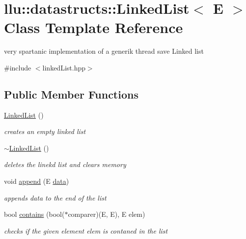 \hypertarget{classllu_1_1datastructs_1_1_linked_list}{\section{llu\+:\+:datastructs\+:\+:Linked\+List$<$ E $>$ Class Template Reference}
\label{classllu_1_1datastructs_1_1_linked_list}
}


very spartanic implementation of a generik thread save Linked list  




{\ttfamily \#include $<$linked\+List.\+hpp$>$}

\subsection*{Public Member Functions}
\begin{DoxyCompactItemize}
\item 
\hyperlink{classllu_1_1datastructs_1_1_linked_list_ae12ddd9d50e228bc8602e902c2e4909e}{Linked\+List} ()
\begin{DoxyCompactList}\small\item\em creates an empty linked list \end{DoxyCompactList}\item 
\hyperlink{classllu_1_1datastructs_1_1_linked_list_a9d51cbffdc243ae0831d7c91a7da528a}{$\sim$\+Linked\+List} ()
\begin{DoxyCompactList}\small\item\em deletes the linekd list and clears memory \end{DoxyCompactList}\item 
void \hyperlink{classllu_1_1datastructs_1_1_linked_list_afb594d9c6ee789ba60070365e8953a29}{append} (E \hyperlink{timux_8hpp_ad9c7575237a3a2780e8e6d16e1334982}{data})
\begin{DoxyCompactList}\small\item\em appends data to the end of the list \end{DoxyCompactList}\item 
bool \hyperlink{classllu_1_1datastructs_1_1_linked_list_a89e2f65a016e358dc174921d496e34ce}{contains} (bool($\ast$comparer)(E, E), E elem)
\begin{DoxyCompactList}\small\item\em checks if the given element elem is contaned in the list \end{DoxyCompactList}\end{DoxyCompactItemize}
